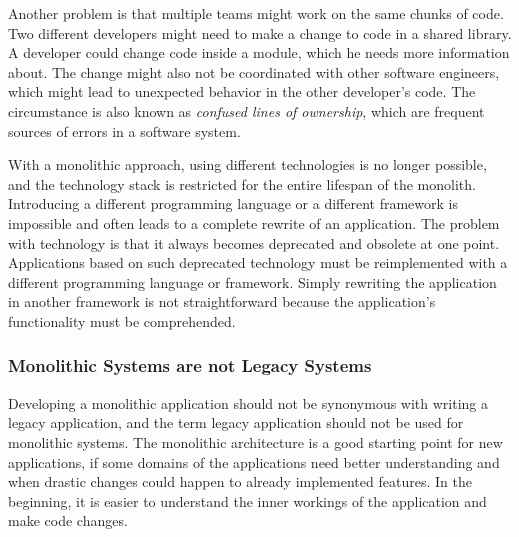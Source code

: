 \bigskip

\noindent Another problem is that multiple teams might work on the same chunks of code. Two different developers might need to make a change to code in a shared library. A developer could change code inside a module, which he needs more information about. The change might also not be coordinated with other software engineers, which might lead to unexpected behavior in the other developer's code. The circumstance is also known as \textit{confused lines of ownership}, which are frequent sources of errors in a software system. \cite[15]{book:2019:newman:background:monolith:monolith-to-microservices} \cite[7]{inproceedings:2011:bird:background:monoliths:dont-touch-my-code}

\bigskip

\noindent With a monolithic approach, using different technologies is no longer possible, and the technology stack is restricted for the entire lifespan of the monolith. Introducing a different programming language or a different framework is impossible and often leads to a complete rewrite of an application. \cite[6-7]{book:2018:richardson:background:bff:microservices-patterns} The problem with technology is that it always becomes deprecated and obsolete at one point. Applications based on such deprecated technology must be reimplemented with a different programming language or framework. Simply rewriting the application in another framework is not straightforward because the application's functionality must be comprehended.

\subsubsection{Monolithic Systems are not Legacy Systems}\label{subsection:background:software-monolith:not-legacy-systems}

Developing a monolithic application should not be synonymous with writing a legacy application, and the term legacy application should not be used for monolithic systems. \cite[15]{book:2019:newman:background:monolith:monolith-to-microservices} The monolithic architecture is a good starting point for new applications, if some domains of the applications need better understanding and when drastic changes could happen to already implemented features. In the beginning, it is easier to understand the inner workings of the application and make code changes. \cite[43]{book:2019:newman:background:monolith:monolith-to-microservices}
